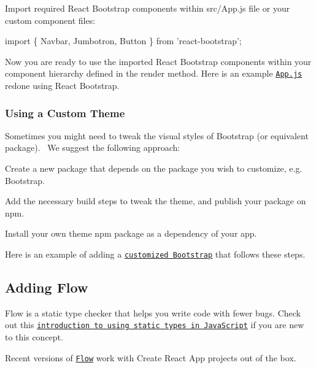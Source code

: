 Import required React Bootstrap components within {\ttfamily src/\+App.\+js} file or your custom component files\+:


\begin{DoxyCode}
import \{ Navbar, Jumbotron, Button \} from 'react-bootstrap';
\end{DoxyCode}


Now you are ready to use the imported React Bootstrap components within your component hierarchy defined in the render method. Here is an example \href{https://gist.githubusercontent.com/gaearon/85d8c067f6af1e56277c82d19fd4da7b/raw/6158dd991b67284e9fc8d70b9d973efe87659d72/App.js}{\tt {\ttfamily App.\+js}} redone using React Bootstrap.

\subsubsection*{Using a Custom Theme}

Sometimes you might need to tweak the visual styles of Bootstrap (or equivalent package).~\newline
 We suggest the following approach\+:


\begin{DoxyItemize}
\item Create a new package that depends on the package you wish to customize, e.\+g. Bootstrap.
\item Add the necessary build steps to tweak the theme, and publish your package on npm.
\item Install your own theme npm package as a dependency of your app.
\end{DoxyItemize}

Here is an example of adding a \href{https://medium.com/@tacomanator/customizing-create-react-app-aa9ffb88165}{\tt customized Bootstrap} that follows these steps.

\subsection*{Adding Flow}

Flow is a static type checker that helps you write code with fewer bugs. Check out this \href{https://medium.com/@preethikasireddy/why-use-static-types-in-javascript-part-1-8382da1e0adb}{\tt introduction to using static types in Java\+Script} if you are new to this concept.

Recent versions of \href{http://flowtype.org/}{\tt Flow} work with Create React App projects out of the box.

